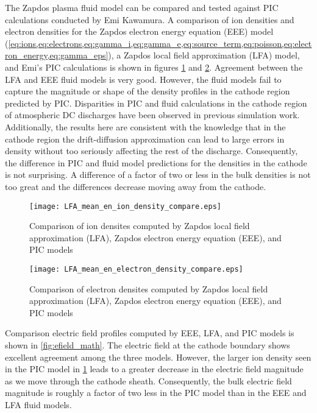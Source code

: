 The Zapdos plasma fluid model can be compared and tested against PIC calculations conducted by Emi Kawamura. \cite{emiComm} A comparison of ion densities and electron densities for the Zapdos electron energy equation (EEE) model (\cref{eq:ions,eq:electrons,eq:gamma_i,eq:gamma_e,eq:source_term,eq:poisson,eq:electron_energy,eq:gamma_eps}), a Zapdos local field approximation (LFA) model, and Emi's PIC calculations is shown in figures \ref{fig:ion_density_math} and \ref{fig:electron_density_math}. Agreement between the LFA and EEE fluid models is very good. However, the fluid models fail to capture the magnitude or shape of the density profiles in the cathode region predicted by PIC. Disparities in PIC and fluid calculations in the cathode region of atmospheric DC discharges have been observed in previous simulation work.\cite{hong2008modeling,choi2007electron,hagelaar2000monte} Additionally, the results here are consistent with the knowledge that in the cathode region the drift-diffusion approximation can lead to large errors in density without too seriously affecting the rest of the discharge.\cite{hagelaar2005solving,hagelaar2000monte} Consequently, the difference in PIC and fluid model predictions for the densities in the cathode is not surprising. A difference of a factor of two or less in the bulk densities is not too great and the differences decrease moving away from the cathode.

\begin{figure}[htbp]
  \centering
  \texttt{[image: LFA\_mean\_en\_ion\_density\_compare.eps]}
  \caption{Comparison of ion densites computed by Zapdos local field approximation (LFA), Zapdos electron energy equation (EEE), and PIC models}
  \label{fig:ion_density_math}
\end{figure}

\begin{figure}[htbp]
  \centering
  \texttt{[image: LFA\_mean\_en\_electron\_density\_compare.eps]}
  \caption{Comparison of electron densites computed by Zapdos local field approximation (LFA), Zapdos electron energy equation (EEE), and PIC models}
  \label{fig:electron_density_math}
\end{figure}

Comparison electric field profiles computed by EEE, LFA, and PIC models is shown in \cref{fig:efield_math}. The electric field at the cathode boundary shows excellent agreement among the three models. However, the larger ion density seen in the PIC model in \cref{fig:ion_density_math} leads to a greater decrease in the electric field magnitude as we move through the cathode sheath. Consequently, the bulk electric field magnitude is roughly a factor of two less in the PIC model than in the EEE and LFA fluid models.

